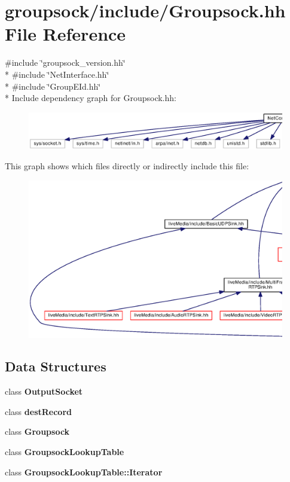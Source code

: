 \section{groupsock/include/\+Groupsock.hh File Reference}
\label{Groupsock_8hh}
{\ttfamily \#include \char`\"{}groupsock\+\_\+version.\+hh\char`\"{}}\\*
{\ttfamily \#include \char`\"{}Net\+Interface.\+hh\char`\"{}}\\*
{\ttfamily \#include \char`\"{}Group\+E\+Id.\+hh\char`\"{}}\\*
Include dependency graph for Groupsock.\+hh\+:
\nopagebreak
\begin{figure}[H]
\begin{center}
\leavevmode
\includegraphics[width=350pt]{Groupsock_8hh__incl}
\end{center}
\end{figure}
This graph shows which files directly or indirectly include this file\+:
\nopagebreak
\begin{figure}[H]
\begin{center}
\leavevmode
\includegraphics[width=350pt]{Groupsock_8hh__dep__incl}
\end{center}
\end{figure}
\subsection*{Data Structures}
\begin{DoxyCompactItemize}
\item 
class {\bf Output\+Socket}
\item 
class {\bf dest\+Record}
\item 
class {\bf Groupsock}
\item 
class {\bf Groupsock\+Lookup\+Table}
\item 
class {\bf Groupsock\+Lookup\+Table\+::\+Iterator}
\end{DoxyCompactItemize}
